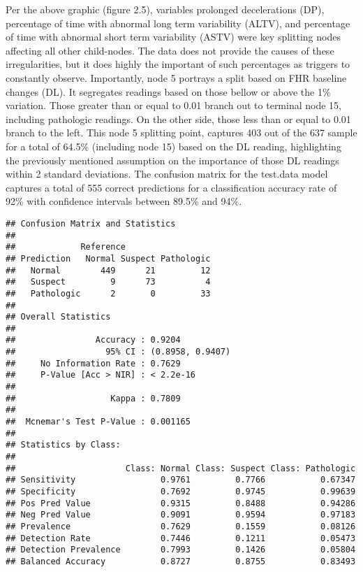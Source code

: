 \documentclass[
]{article}
\newenvironment{Shaded}{\begin{snugshade}}{\end{snugshade}}
\newcommand{\AttributeTok}[1]{\textcolor[rgb]{0.77,0.63,0.00}{#1}}
\newcommand{\CommentTok}[1]{\textcolor[rgb]{0.56,0.35,0.01}{\textit{#1}}}
\newcommand{\FunctionTok}[1]{\textcolor[rgb]{0.00,0.00,0.00}{#1}}
\newcommand{\NormalTok}[1]{#1}
\newcommand{\OtherTok}[1]{\textcolor[rgb]{0.56,0.35,0.01}{#1}}
\newcommand{\SpecialCharTok}[1]{\textcolor[rgb]{0.00,0.00,0.00}{#1}}
\newcommand{\StringTok}[1]{\textcolor[rgb]{0.31,0.60,0.02}{#1}}
\begin{document}
Per the above graphic (figure 2.5), variables prolonged decelerations
(DP), percentage of time with abnormal long term variability (ALTV), and
percentage of time with abnormal short term variability (ASTV) were key
splitting nodes affecting all other child-nodes. The data does not
provide the causes of these irregularities, but it does highly the
important of such percentages as triggers to constantly observe.
Importantly, node 5 portrays a split based on FHR baseline changes (DL).
It segregates readings based on those bellow or above the 1\% variation.
Those greater than or equal to 0.01 branch out to terminal node 15,
including pathologic readings. On the other side, those less than or
equal to 0.01 branch to the left. This node 5 splitting point, captures
403 out of the 637 sample for a total of 64.5\% (including node 15)
based on the DL reading, highlighting the previously mentioned
assumption on the importance of those DL readings within 2 standard
deviations. The confusion matrix for the test.data model captures a
total of 555 correct predictions for a classification accuracy rate of
92\% with confidence intervals between 89.5\% and 94\%.

\begin{Shaded}
\end{Shaded}

\begin{verbatim}
## Confusion Matrix and Statistics
## 
##             Reference
## Prediction   Normal Suspect Pathologic
##   Normal        449      21         12
##   Suspect         9      73          4
##   Pathologic      2       0         33
## 
## Overall Statistics
##                                           
##                Accuracy : 0.9204          
##                  95% CI : (0.8958, 0.9407)
##     No Information Rate : 0.7629          
##     P-Value [Acc > NIR] : < 2.2e-16       
##                                           
##                   Kappa : 0.7809          
##                                           
##  Mcnemar's Test P-Value : 0.001165        
## 
## Statistics by Class:
## 
##                      Class: Normal Class: Suspect Class: Pathologic
## Sensitivity                 0.9761         0.7766           0.67347
## Specificity                 0.7692         0.9745           0.99639
## Pos Pred Value              0.9315         0.8488           0.94286
## Neg Pred Value              0.9091         0.9594           0.97183
## Prevalence                  0.7629         0.1559           0.08126
## Detection Rate              0.7446         0.1211           0.05473
## Detection Prevalence        0.7993         0.1426           0.05804
## Balanced Accuracy           0.8727         0.8755           0.83493
\end{verbatim}
\end{document}
